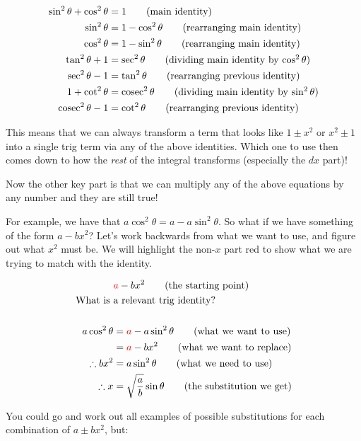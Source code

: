 \begin{align*}
    \sin^2 \theta + \cos^2 \theta &= 1 \tag{main identity}\\
    \sin^2 \theta &= 1 - \cos^2 \theta \tag{rearranging main identity}\\
    \cos^2 \theta &= 1 - \sin^2 \theta \tag{rearranging main identity}\\
    \tan^2 \theta + 1 &= \sec^2 \theta \tag{dividing main identity by $\cos^2\theta$}\\
    \sec^2 \theta - 1 &= \tan^2 \theta \tag{rearranging previous identity} \\
    1 + \cot^2 \theta &= \operatorname{cosec}^2 \theta \tag{dividing main identity by $\sin^2\theta$} \\
    \operatorname{cosec}^2 \theta - 1 &= \cot^2 \theta \tag{rearranging previous identity}
\end{align*}

This means that we can always transform a term that looks like $1 \pm x^2$ or $x^2 \pm 1$ into a single trig term via any of the above identities.
Which one to use then comes down to how the \emph{rest} of the integral transforms (especially the $dx$ part)!

Now the other key part is that we can multiply any of the above equations by any number and they are still true!

For example, we have that $a\cos^2 \theta = a - a \sin^2 \theta$. So what if we have something of the form $a-bx^2$? Let's work backwards from what we want to use, and figure out what $x^2$ must be.
We will highlight the non-$x$ part red to show what we are trying to match with the identity.

\begin{align*}
    &\textcolor{red}{a}-bx^2 \tag{the starting point}\\
    \text{What is }&\text{a relevant trig identity?}\\
    \\
    a\cos^2 \theta &= \textcolor{red}{a} - a \sin^2 \theta \tag{what we want to use}\\
     &= \textcolor{red}{a} - bx^2 \tag{what we want to replace}\\
     \therefore  bx^2 &= a\sin^2 \theta \tag{what we need to use}\\
     \therefore x &= \sqrt{\frac{a}{b}}\sin \theta \tag{the substitution we get}
\end{align*}

You could go and work out all examples of possible substitutions for each combination of $a \pm bx^2$, but:


